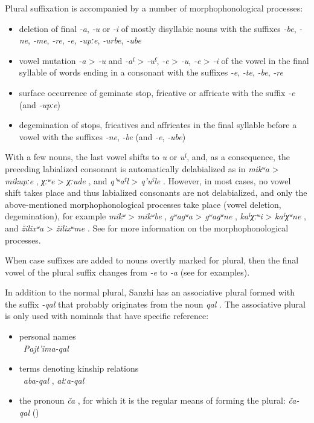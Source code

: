 Plural suffixation is accompanied by a number of morphophonological processes:
%
\begin{itemize}
	\item	deletion of final \textit{-a}, \textit{-u} or \textit{-i} of mostly disyllabic nouns with the suffixes \textit{-be}, \textit{-ne}, \textit{-me}, \textit{-re}, \textit{-e}, \textit{-upːe}, \textit{-urbe}, \textit{-ube}
	\item	vowel mutation \textit{-a} > \textit{-u} and \textit{-aˁ} > \textit{-uˁ}, \textit{-e} > \textit{-u}, \textit{-e} > \textit{-i} of the vowel in the final syllable of words ending in a consonant with the suffixes \textit{-e}, \textit{-te}, \textit{-be}, \textit{-re} 
	\item	surface occurrence of geminate stop, fricative or affricate with the suffix \textit{-e} (and \textit{-upːe})
	\item	degemination of stops, fricatives and affricates in the final syllable before a vowel with the suffixes \textit{-ne}, \textit{-be} (and \textit{-e}, \textit{-ube})
\end{itemize}

With a few nouns, the last vowel shifts to \textit{u} or \textit{uˁ}, and, as a consequence, the preceding labialized consonant is automatically delabialized as in \textit{mikʷa} > \textit{mikupːe} , \textit{χːʷe} > \textit{χːude} , and \textit{q'ʷaˁl} > \textit{q'uˁle} . However, in most cases, no vowel shift takes place and thus labialized consonants are not delabialized, and only the above-mentioned morphophonological processes take place (vowel deletion, degemination), for example \textit{mikʷ} > \textit{mikʷbe} , \textit{gʷagʷa} > \textit{gʷagʷne} , \textit{kaˁχːʷi} > \textit{kaˁχʷne} , and \textit{žilixʷa} > \textit{žilixʷme} . See  for more information on the morphophonological processes.

When case suffixes are added to nouns overtly marked for plural, then the final vowel of the plural suffix changes from \textit{-e} to \textit{-a} (see  for examples).

In addition to the normal plural, Sanzhi has an associative plural formed with the suffix \textit{-qal} that probably originates from the noun \textit{qal} . The associative plural is only used with nominals that have specific reference:
%
\begin{itemize}
	\item	personal names\\
		\teg\ \textit{Pajt'ima-qal} 
	\item	terms denoting kinship relations\\
		\teg\ \textit{aba-qal} , \textit{atːa-qal} 
	\item	the pronoun \textit{ča} , for which it is the regular means of forming the plural: \textit{ča-qal} ()
\end{itemize}

